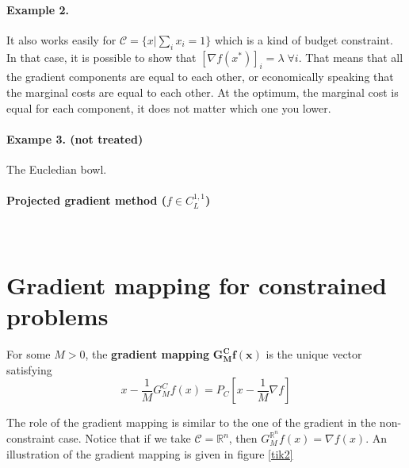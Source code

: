 \documentclass[a4paper]{article}
\begin{document}
\paragraph{Example 2.} It also works easily for $\mathcal{C} = \{x|\sum_{i}x_i=1\}$ which is a kind of budget constraint. In that case, it is possible to show that $[\nabla f(x^*)]_i = \lambda \; \forall i$. That means that all the gradient components are equal to each other, or economically speaking that the marginal costs are equal to each other. At the optimum, the marginal cost is equal for each component, it does not matter which one you lower.

\paragraph{Exampe 3. (not treated)} The Eucledian bowl.

\paragraph{Projected gradient method ($f\in C_L^{1,1}$)}~~\\
\newline
\hspace*{2cm}
 


\section{Gradient mapping for constrained problems}

\begin{def1}
For some $M>0$, the \textbf{gradient mapping} $\mathbf{G_M^Cf(x)}$ is the unique vector satisfying 
\begin{equation*}
x - \frac{1}{M}G_M^Cf(x) = P_C\left[x - \frac{1}{M}\nabla f\right]
\end{equation*}
\end{def1}
\noindent The role of the gradient mapping is similar to the one of the gradient in the non-constraint case. Notice that if we take $\mathcal{C} = \mathbb{R}^n$, then $G_M^{\mathbb{R}^n}f(x) = \nabla f(x)$. An illustration of the gradient mapping is given in figure \ref{tik2}
\end{document}

